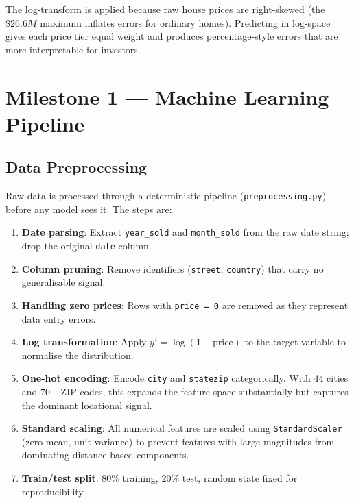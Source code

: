 \documentclass[12pt, a4paper]{article}
\begin{document}
The log-transform is applied because raw house prices are right-skewed (the $\$26.6M$
maximum inflates errors for ordinary homes). Predicting in log-space gives each price
tier equal weight and produces percentage-style errors that are more interpretable for
investors.

\section{Milestone 1 --- Machine Learning Pipeline}

\subsection{Data Preprocessing}

Raw data is processed through a deterministic pipeline (\texttt{preprocessing.py})
before any model sees it. The steps are:

\begin{enumerate}[leftmargin=1.6em]
  \item \textbf{Date parsing}: Extract \texttt{year\_sold} and \texttt{month\_sold}
        from the raw date string; drop the original \texttt{date} column.
  \item \textbf{Column pruning}: Remove identifiers (\texttt{street}, \texttt{country})
        that carry no generalisable signal.
  \item \textbf{Handling zero prices}: Rows with \texttt{price = 0} are removed as
        they represent data entry errors.
  \item \textbf{Log transformation}: Apply $y' = \log(1 + \text{price})$ to the
        target variable to normalise the distribution.
  \item \textbf{One-hot encoding}: Encode \texttt{city} and \texttt{statezip}
        categorically. With 44 cities and 70+ ZIP codes, this expands the feature
        space substantially but captures the dominant locational signal.
  \item \textbf{Standard scaling}: All numerical features are scaled using
        \texttt{StandardScaler} (zero mean, unit variance) to prevent features with
        large magnitudes from dominating distance-based components.
  \item \textbf{Train/test split}: 80\% training, 20\% test, random state fixed for
        reproducibility.
\end{enumerate}
\end{document}
